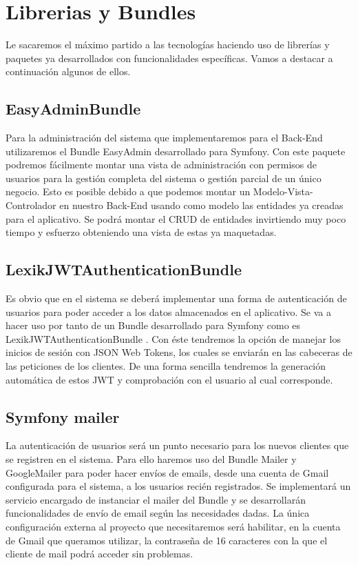 \section{Librerias y Bundles}

Le sacaremos el máximo partido a las tecnologías haciendo uso de librerías y paquetes ya desarrollados con funcionalidades específicas. Vamos a destacar a continuación algunos de ellos.

\subsection{EasyAdminBundle}

Para la administración del sistema que implementaremos para el Back-End utilizaremos el Bundle EasyAdmin \cite{easyadmin} desarrollado para Symfony. Con este paquete podremos fácilmente montar una vista de administración con permisos de usuarios para la gestión completa del sistema o gestión parcial de un único negocio. Esto es posible debido a que podemos montar un Modelo-Vista-Controlador en nuestro Back-End usando como modelo las entidades ya creadas para el aplicativo. Se podrá montar el CRUD de entidades invirtiendo muy poco tiempo y esfuerzo obteniendo una vista de estas ya maquetadas.

\subsection{LexikJWTAuthenticationBundle}

Es obvio que en el sistema se deberá implementar una forma de autenticación de usuarios para poder acceder a los datos almacenados en el aplicativo. Se va a hacer uso por tanto de un Bundle desarrollado para Symfony como es LexikJWTAuthenticationBundle \cite{jwt}. Con éste tendremos la opción de manejar los inicios de sesión con JSON Web Tokens, los cuales se enviarán en las cabeceras de las peticiones de los clientes. De una forma sencilla tendremos la generación automática de estos JWT y comprobación con el usuario al cual corresponde.

\subsection{Symfony mailer}

La autenticación de usuarios será un punto necesario para los nuevos clientes que se registren en el sistema. Para ello haremos uso del Bundle Mailer y GoogleMailer para poder hacer envíos de emails, desde una cuenta de Gmail configurada para el sistema, a los usuarios recién registrados. Se implementará un servicio encargado de instanciar el mailer del Bundle y se desarrollarán funcionalidades de envío de email según las necesidades dadas. La única configuración externa al proyecto que necesitaremos será habilitar, en la cuenta de Gmail que queramos utilizar, la contraseña de 16 caracteres con la que el cliente de mail podrá acceder sin problemas.\\

